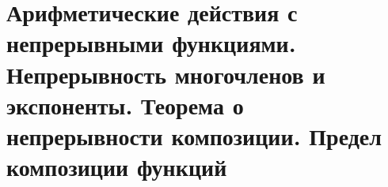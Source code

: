 \section{Арифметические действия с непрерывными функциями. Непрерывность многочленов и экспоненты. Теорема о непрерывности композиции. Предел композиции функций}